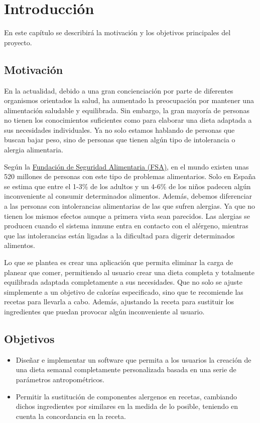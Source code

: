 \chapter{Introducción}
En este capítulo se describirá la motivación y los objetivos principales del proyecto.

\section{Motivación}
En la actualidad, debido a una gran concienciación por parte de diferentes organismos orientados la salud, ha aumentado la preocupación por mantener una alimentación saludable y equilibrada. Sin embargo, la gran mayoría de personas no tienen los conocimientos suficientes como para elaborar una dieta adaptada a sus necesidades individuales. Ya no solo estamos hablando de personas que buscan bajar peso, sino de personas que tienen algún tipo de intolerancia o alergia alimentaria. 

Según la \href{https://funsapa.org/alergia-alimentaria/incidencia/}{Fundación de Seguridad Alimentaria (FSA)}, en el mundo existen unas 520 millones de personas con este tipo de problemas alimentarios. Solo en España se estima que entre el 1-3\% de los adultos y un 4-6\% de los niños padecen algún inconveniente al consumir determinados alimentos. Además, debemos diferenciar a las personas con intolerancias alimentarias de las que sufren alergias. Ya que no tienen los mismos efectos aunque a primera vista sean parecidos. Las alergias se producen cuando el sistema inmune entra en contacto con el alérgeno, mientras que las intolerancias están ligadas a la dificultad para digerir determinados alimentos.

Lo que se plantea es crear una aplicación que permita eliminar la carga de planear que comer, permitiendo al usuario crear una dieta completa y totalmente equilibrada adaptada completamente a sus necesidades. Que no solo se ajuste simplemente a un objetivo de calorías especificado, sino que te recomiende las recetas para llevarla a cabo. Además, ajustando la receta para sustituir los ingredientes que puedan provocar algún inconveniente al usuario.

\section{Objetivos}
\begin{itemize}
    \item Diseñar e implementar un software que permita a los usuarios la creación de una dieta semanal completamente personalizada basada en una serie de parámetros antropométricos.
    \item Permitir la sustitución de componentes alergenos en recetas, cambiando dichos ingredientes por similares en la medida de lo posible, teniendo en cuenta la concordancia en la receta.
\end{itemize}